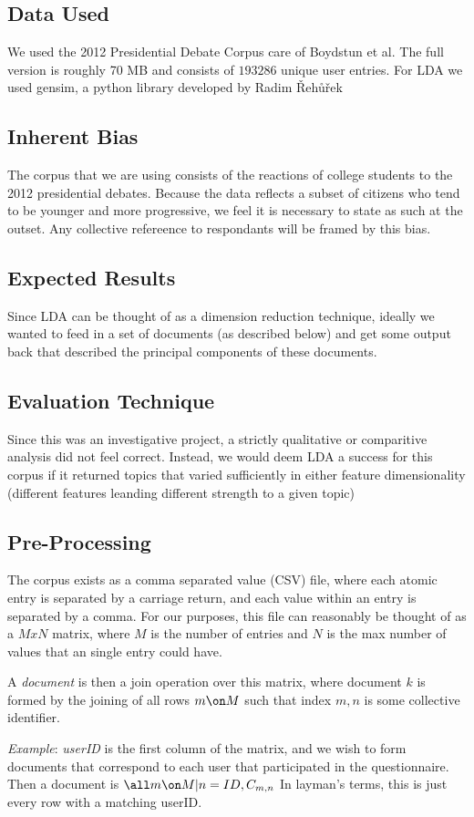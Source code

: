 \subsection{Data Used}
We used the 2012  Presidential Debate Corpus care of Boydstun et al. The full version is roughly 70 MB and consists of  $193286$ unique user entries.
For LDA we used gensim, a python library developed by Radim Řehůřek \cite{gensim}

\subsection{Inherent Bias}
The corpus that we are using consists of the reactions of college students to the 2012 presidential debates. Because the data reflects a subset of citizens who tend to be younger and more progressive, we feel it is necessary to state as such at the outset. Any collective refereence to respondants will be framed by this bias.

\subsection{Expected Results}
Since LDA can be thought of as a dimension reduction technique, ideally we wanted to feed in a set of documents (as described below) and get some output back that described the principal components of these documents.

\subsection{Evaluation Technique}
Since this was an investigative project, a strictly qualitative or comparitive analysis did not feel correct. Instead, we would deem LDA a success for this corpus if it returned topics that varied sufficiently in either feature dimensionality (different features leanding different strength to a given topic) 

\subsection{Pre-Processing}
The corpus exists as a comma separated value (CSV) file, where each atomic entry is separated by a carriage return, and each value within an entry is separated by a comma. For our purposes, this file can reasonably be thought of as a $MxN$ matrix, where $M$ is the number of entries and $N$ is the max number of values that an single entry could have.

A \emph{document} is then a join operation over this matrix, where document $k$ is formed by the joining of all rows $m \on M$ such that index $m,n$ is some collective identifier.

\emph{Example}: \emph{userID} is the first column of the matrix, and we wish to form documents that correspond to each user that participated in the questionnaire. Then a document is $\all m \on M | n = ID ,C_{m,n}$ In layman's terms, this is just every row with a matching userID.


